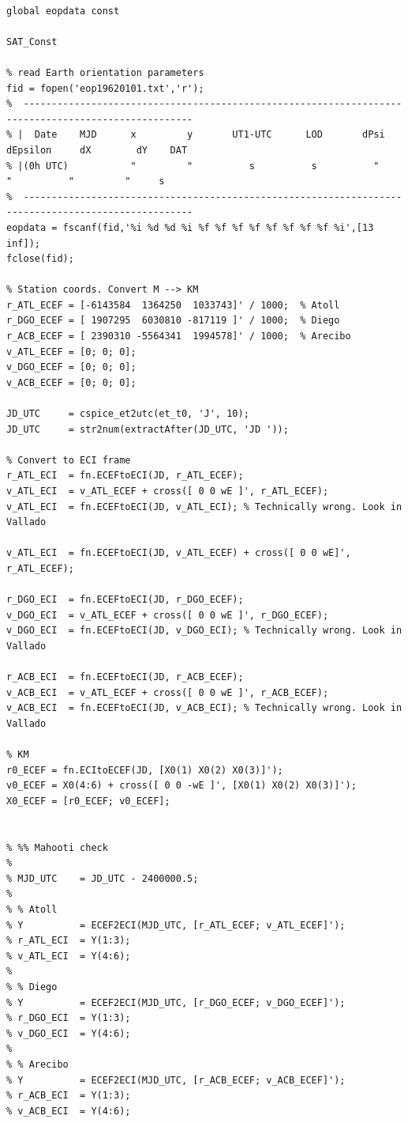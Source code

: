 \documentclass[conf]{new-aiaa}
\begin{document}
\begin{lstlisting}[basicstyle=\footnotesize]
%% Convert coordinates ECEF <--> ECI 

global eopdata const

SAT_Const

% read Earth orientation parameters
fid = fopen('eop19620101.txt','r');
%  ----------------------------------------------------------------------------------------------------
% |  Date    MJD      x         y       UT1-UTC      LOD       dPsi    dEpsilon     dX        dY    DAT
% |(0h UTC)           "         "          s          s          "        "          "         "     s 
%  ----------------------------------------------------------------------------------------------------
eopdata = fscanf(fid,'%i %d %d %i %f %f %f %f %f %f %f %f %i',[13 inf]);
fclose(fid);

% Station coords. Convert M --> KM 
r_ATL_ECEF = [-6143584  1364250  1033743]' / 1000;  % Atoll 
r_DGO_ECEF = [ 1907295  6030810 -817119 ]' / 1000;  % Diego 
r_ACB_ECEF = [ 2390310 -5564341  1994578]' / 1000;  % Arecibo 
v_ATL_ECEF = [0; 0; 0]; 
v_DGO_ECEF = [0; 0; 0]; 
v_ACB_ECEF = [0; 0; 0]; 

JD_UTC     = cspice_et2utc(et_t0, 'J', 10); 
JD_UTC     = str2num(extractAfter(JD_UTC, 'JD ')); 

% Convert to ECI frame 
r_ATL_ECI  = fn.ECEFtoECI(JD, r_ATL_ECEF); 
v_ATL_ECI  = v_ATL_ECEF + cross([ 0 0 wE ]', r_ATL_ECEF); 
v_ATL_ECI  = fn.ECEFtoECI(JD, v_ATL_ECI); % Technically wrong. Look in Vallado 

v_ATL_ECI  = fn.ECEFtoECI(JD, v_ATL_ECEF) + cross([ 0 0 wE]', r_ATL_ECEF); 

r_DGO_ECI  = fn.ECEFtoECI(JD, r_DGO_ECEF); 
v_DGO_ECI  = v_ATL_ECEF + cross([ 0 0 wE ]', r_DGO_ECEF); 
v_DGO_ECI  = fn.ECEFtoECI(JD, v_DGO_ECI); % Technically wrong. Look in Vallado 

r_ACB_ECI  = fn.ECEFtoECI(JD, r_ACB_ECEF); 
v_ACB_ECI  = v_ATL_ECEF + cross([ 0 0 wE ]', r_ACB_ECEF); 
v_ACB_ECI  = fn.ECEFtoECI(JD, v_ACB_ECI); % Technically wrong. Look in Vallado 

% KM 
r0_ECEF = fn.ECItoECEF(JD, [X0(1) X0(2) X0(3)]'); 
v0_ECEF = X0(4:6) + cross([ 0 0 -wE ]', [X0(1) X0(2) X0(3)]'); 
X0_ECEF = [r0_ECEF; v0_ECEF]; 


% %% Mahooti check 
% 
% MJD_UTC    = JD_UTC - 2400000.5; 
% 
% % Atoll 
% Y          = ECEF2ECI(MJD_UTC, [r_ATL_ECEF; v_ATL_ECEF]'); 
% r_ATL_ECI  = Y(1:3); 
% v_ATL_ECI  = Y(4:6); 
% 
% % Diego
% Y          = ECEF2ECI(MJD_UTC, [r_DGO_ECEF; v_DGO_ECEF]'); 
% r_DGO_ECI  = Y(1:3); 
% v_DGO_ECI  = Y(4:6); 
% 
% % Arecibo 
% Y          = ECEF2ECI(MJD_UTC, [r_ACB_ECEF; v_ACB_ECEF]'); 
% r_ACB_ECI  = Y(1:3); 
% v_ACB_ECI  = Y(4:6); 



\end{lstlisting}
\end{document}
